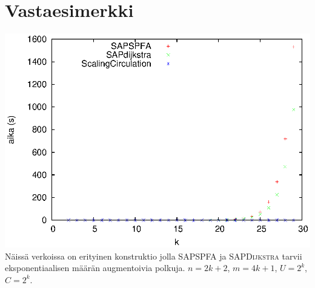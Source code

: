 \documentclass[a4paper, 11pt]{article}
\begin{document}
\section*{Vastaesimerkki}
\includegraphics[scale=1.4]{application/random/pathological.eps}\\
Näissä verkoissa on erityinen konstruktio jolla \textsc{SAPSPFA} ja \textsc{SAPDijkstra} tarvii eksponentiaalisen
määrän augmentoivia polkuja. $n = 2k+2$, $m = 4k+1$, $U = 2^k$, $C = 2^k$.
\end{document}
